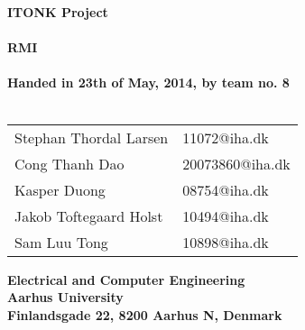 \begin{titlepage}
\begin{center}
{\LARGE \textbf{ITONK Project}}\\~\\
{\LARGE \textbf{RMI}}\\~\\
\textbf{Handed in 23th of May, 2014, by team no. 8}\\~\\
\begin{tabular}{ll}
Stephan Thordal Larsen & 11072@iha.dk \\
Cong Thanh Dao & 20073860@iha.dk \\
Kasper Duong & 08754@iha.dk \\
Jakob Toftegaard Holst & 10494@iha.dk \\
Sam Luu Tong & 10898@iha.dk \\
\end{tabular}
\vfill
\textbf{Electrical and Computer Engineering}\\
\textbf{Aarhus University}\\
\textbf{Finlandsgade 22, 8200 Aarhus N, Denmark}
\end{center}
\end{titlepage} 
